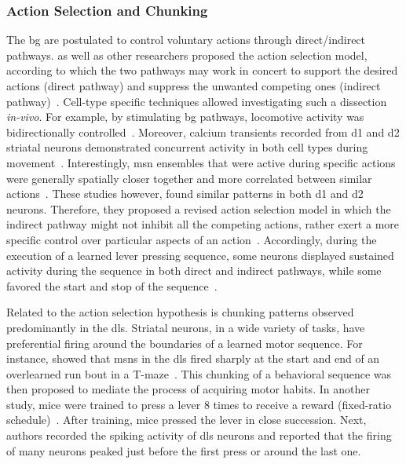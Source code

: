 \subsubsection{Action Selection and Chunking}
The \gls{bg} are postulated to control voluntary actions through direct/indirect pathways.
 as well as other researchers proposed the action selection model, according to which the two pathways may work in concert to support the desired actions (direct pathway) and suppress the unwanted competing ones (indirect pathway)~\cite{Mink1996}.
Cell-type specific techniques allowed investigating such a dissection \textit{in-vivo}.
For example, by stimulating \gls{bg} pathways, locomotive activity was bidirectionally controlled~\cite{Kravitz2010Nature}.
Moreover, calcium transients recorded from \gls{d1} and \gls{d2} striatal neurons demonstrated concurrent activity in both cell types during movement~\cite{Cui2013Nature,Barbera2016Neuron}.
Interestingly, \gls{msn} ensembles that were active during specific actions were generally spatially closer together and more correlated between similar actions~\cite{Klaus2017Neuron}.
These studies however, found similar patterns in both \gls{d1} and \gls{d2} neurons.
Therefore, they proposed a revised action selection model in which the indirect pathway might not inhibit all the competing actions, rather exert a more specific control over particular aspects of an action~\cite{Klaus2017Neuron}.
Accordingly, during the execution of a learned lever pressing sequence, some neurons displayed sustained activity during the sequence in both direct and indirect pathways, while some favored the start and stop of the sequence~\cite{Jin2014NN}.
\par
Related to the action selection hypothesis is chunking patterns observed predominantly in the \gls{dls}.
Striatal neurons, in a wide variety of tasks, have preferential firing around the boundaries of a learned motor sequence.
For instance,  showed that \glspl{msn} in the \gls{dls} fired sharply at the start and end of an overlearned run bout in a T-maze~\cite{Barnes2005Nature}.
This chunking of a behavioral sequence was then proposed to mediate the process of acquiring motor habits.
In another study, mice were trained to press a lever 8 times to receive a reward (fixed-ratio schedule)~\cite{Jin2010N}.
After training, mice pressed the lever in close succession.
Next, authors recorded the spiking activity of \gls{dls} neurons and reported that the firing of many neurons peaked just before the first press or around the last one.
